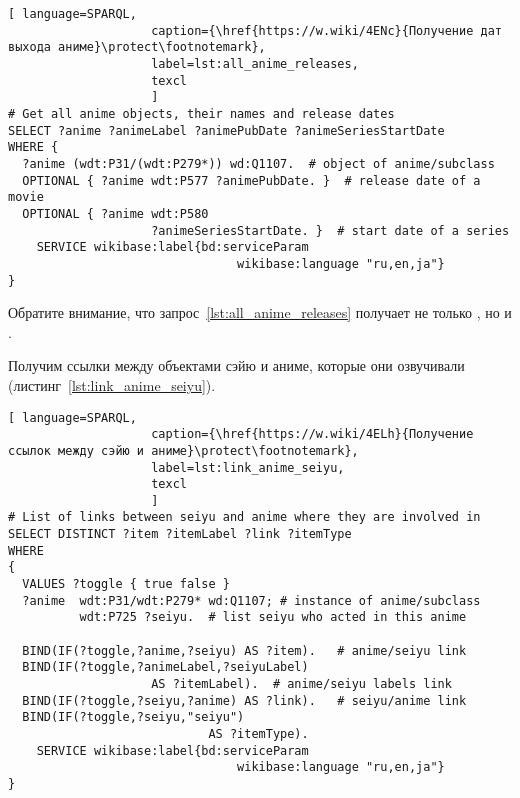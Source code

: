 \begin{lstlisting}[ language=SPARQL, 
                    caption={\href{https://w.wiki/4ENc}{Получение дат выхода аниме}\protect\footnotemark},
                    label=lst:all_anime_releases,
                    texcl 
                    ]
# Get all anime objects, their names and release dates
SELECT ?anime ?animeLabel ?animePubDate ?animeSeriesStartDate
WHERE {
  ?anime (wdt:P31/(wdt:P279*)) wd:Q1107.  # object of anime/subclass
  OPTIONAL { ?anime wdt:P577 ?animePubDate. }  # release date of a movie
  OPTIONAL { ?anime wdt:P580
					?animeSeriesStartDate. }  # start date of a series
    SERVICE wikibase:label{bd:serviceParam
					     		wikibase:language "ru,en,ja"}
}
\end{lstlisting}%

Обратите внимание, что запрос~\ref{lst:all_anime_releases} получает не только  , но и . 

Получим ссылки между объектами сэйю и аниме, которые они озвучивали (листинг~\ref{lst:link_anime_seiyu}).

\begin{lstlisting}[ language=SPARQL, 
                    caption={\href{https://w.wiki/4ELh}{Получение ссылок между сэйю и аниме}\protect\footnotemark},
                    label=lst:link_anime_seiyu,
                    texcl 
                    ]
# List of links between seiyu and anime where they are involved in
SELECT DISTINCT ?item ?itemLabel ?link ?itemType
WHERE
{
  VALUES ?toggle { true false }
  ?anime  wdt:P31/wdt:P279* wd:Q1107; # instance of anime/subclass
          wdt:P725 ?seiyu.  # list seiyu who acted in this anime
  
  BIND(IF(?toggle,?anime,?seiyu) AS ?item).   # anime/seiyu link
  BIND(IF(?toggle,?animeLabel,?seiyuLabel)
					AS ?itemLabel).  # anime/seiyu labels link
  BIND(IF(?toggle,?seiyu,?anime) AS ?link).   # seiyu/anime link
  BIND(IF(?toggle,?seiyu,"seiyu")
							AS ?itemType).
    SERVICE wikibase:label{bd:serviceParam
					     		wikibase:language "ru,en,ja"}
}
\end{lstlisting}%


